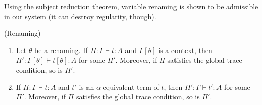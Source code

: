 
Using the subject reduction theorem, variable renaming is shown to be admissible in our system (it can destroy regularity, though).

\begin{proposition}(Renaming)
\label{prop:renaming}
  \begin{enumerate}
  \item\label{prop:renaming1}
    Let $\theta$ be a renaming.
    If $\Pi:\Gamma\vdash t:A$ and $\Gamma[\theta]$ is a context, 
    then $\Pi':\Gamma[\theta]\vdash t[\theta]:A$ for some $\Pi'$.
    Moreover, if $\Pi$ satisfies the global trace condition, so is $\Pi'$.
  \item\label{prop:renaming2}
    If $\Pi:\Gamma\vdash t:A$ and $t'$ is an $\alpha$-equivalent term of $t$,
    then $\Pi':\Gamma\vdash t':A$ for some $\Pi'$.
    Moreover, if $\Pi$ satisfies the global trace condition, so is $\Pi'$.
  \end{enumerate}
\end{proposition}


%
%

